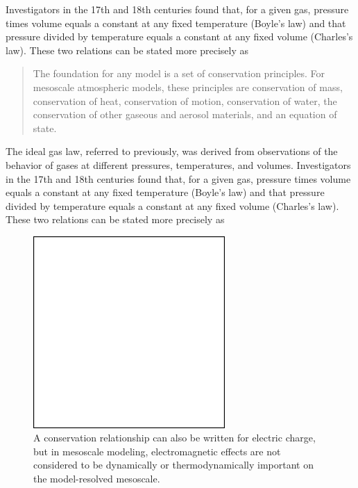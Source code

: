 \documentclass[onecolumn,authoryear]{els-mrw}
\begin{document}
Investigators in the 17th and 18th
centuries found that, for a given gas, pressure times volume equals a
constant at any fixed temperature (Boyle's law) and that pressure
divided by temperature equals a constant at any fixed volume
(Charles's law). These two relations can be stated more precisely as
\begin{quote}
The foundation for any model is a set of conservation principles. For mesoscale atmospheric models, these principles are conservation of mass, conservation of heat, conservation of motion, conservation of water, the conservation of other gaseous and aerosol materials, and an equation of state.
\end{quote}
The ideal gas law, referred to previously, was derived from
observations of the behavior of gases at different pressures,
temperatures, and volumes. Investigators in the 17th and 18th
centuries found that, for a given gas, pressure times volume equals a
constant at any fixed temperature (Boyle's law) and that pressure
divided by temperature equals a constant at any fixed volume
(Charles's law). These two relations can be stated more precisely as

\begin{figure}[b]
\centering
\includegraphics[width=0.65\textwidth]{blankfig}
\caption{A conservation relationship can also be written for electric charge, but in mesoscale modeling, electromagnetic effects are not considered to be dynamically or thermodynamically important on the model-resolved mesoscale.}
\label{chap1:fig2}
\end{figure}
\end{document}
